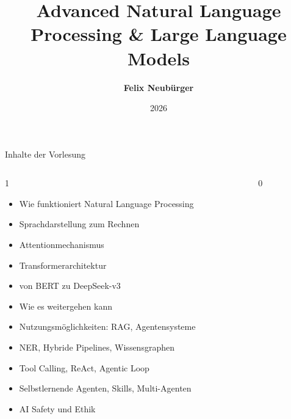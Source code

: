 \documentclass[aspectratio=1610, xcolor=dvipsnames, 9pt]{beamer}
\title{Advanced Natural Language Processing \& Large Language Models}
\author[F.~Neubürger]{ \textbf{Felix Neubürger}}
\institute[I \& W]{Fachhochschule Südwestfalen, Ingenieurs- \& Wirtschaftswissenschaften}
\date{2026}
\begin{document}
\maketitle

\begin{frame}{Inhalte der Vorlesung}
  \begin{columns}
    \begin{column}{1\textwidth}
      \begin{itemize}
        \item Wie funktioniert Natural Language Processing\newline
        \item Sprachdarstellung zum Rechnen \newline
        \item Attentionmechanismus \newline
        \item Transformerarchitektur  \newline
        \item von BERT zu DeepSeek-v3 \newline 
        \item Wie es weitergehen kann \newline
        \item Nutzungsmöglichkeiten: RAG, Agentensysteme \newline
        \item NER, Hybride Pipelines, Wissensgraphen \newline
        \item Tool Calling, ReAct, Agentic Loop \newline
        \item Selbstlernende Agenten, Skills, Multi-Agenten \newline
        \item AI Safety und Ethik
      \end{itemize}
    \end{column}
    \begin{column}{0\textwidth}
    \end{column}
  \end{columns}
\end{frame}
\end{document}

